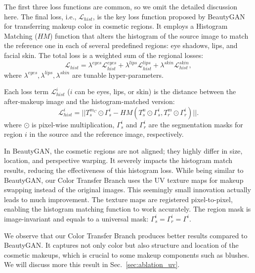 \documentclass[final]{cvpr}
\newcommand{\Sref}[1]{Sec.~\ref{#1}}
\begin{document}
The first three loss functions are common, so we omit the detailed discussion here. The final loss, i.e., $\mathcal{L}_{hist}$, is the key loss function proposed by BeautyGAN for transferring makeup color in cosmetic regions. It employs a Histogram Matching ($HM$) function that alters the histogram of the source image to match the reference one in each of several predefined regions: eye shadows, lips, and facial skin. The total loss is a weighted sum of the regional losses:
\begin{equation}
\mathcal{L}_{hist} = \lambda^{eyes}  \mathcal{L}_{hist}^{eyes} + \lambda^{lips}  \mathcal{L}_{hist}^{lips} + \lambda^{skin}  \mathcal{L}_{hist}^{skin},
\end{equation}
where $\lambda^{eyes}, \lambda^{lips}, \lambda^{skin}$ are tunable hyper-parameters.
 
 Each loss term $\mathcal{L}_{hist}^i$ ($i$ can be eyes, lips, or skin) is the distance between the after-makeup image and the histogram-matched version:
\begin{equation}
    \mathcal{L}_{hist}^i = \big|\big|T_{s}^{m_C} \odot \Gamma_{s}^i - HM(T_{s}^{n} \odot \Gamma_{s}^i, T_{r}^{m} \odot \Gamma_{r}^i)\big|\big|.
\end{equation}
where $\odot$ is pixel-wise multiplication, $\Gamma_{s}^i$ and $\Gamma_{r}^i$ are the segmentation masks for region $i$ in the source and the reference image, respectively.

In BeautyGAN, the cosmetic regions are not aligned; they highly differ in size, location, and perspective warping. It severely impacts the histogram match results, reducing the effectiveness of this histogram loss. While being similar to BeautyGAN, our Color Transfer Branch uses the UV texture maps for makeup swapping instead of the original images. This seemingly small innovation actually leads to much improvement. The texture maps are registered pixel-to-pixel, enabling the histogram matching function to work accurately. The region mask is image-invariant and equals to a universal mask: $\Gamma_{s}^i = \Gamma_{r}^i = \Gamma^i$.


We observe that our Color Transfer Branch produces better results compared to BeautyGAN. It captures not only color but also structure and location of the cosmetic makeups, which is crucial to some makeup components such as blushes. We will discuss more this result in \Sref{sec:ablation_uv}.
\end{document}
